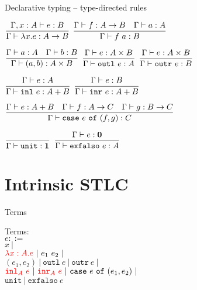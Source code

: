 \documentclass{beamer}
\newcommand{\pipe}{\ |\ }
\newcommand{\Fun}[2]{#1 \to #2}
\newcommand{\Prod}[2]{#1 \times #2}
\newcommand{\Sum}[2]{#1 + #2}
\newcommand{\Unit}{\textbf{1}}
\newcommand{\Empty}{\textbf{0}}
\newcommand{\fun}[2]{\lambda #1. #2}
\newcommand{\app}[2]{#1\ #2}
\newcommand{\pair}[2]{(#1, #2)}
\newcommand{\outl}[1][]{\texttt{outl}\ #1}
\newcommand{\outr}[1][]{\texttt{outr}\ #1}
\newcommand{\inl}[1][]{\texttt{inl}\ #1}
\newcommand{\inr}[1][]{\texttt{inr}\ #1}
\newcommand{\case}[3]{\texttt{case}\ #1\ \texttt{of}\ (#2, #3)}
\newcommand{\unit}{\texttt{unit}}
\newcommand{\exfalso}[1][]{\texttt{exfalso}\ #1}
\newcommand{\fulltyping}[3]{#1 \vdash #2 : #3}
\newcommand{\typing}[2]{\fulltyping{\Gamma}{#1}{#2}}
\newcommand{\infrule}[3][]{\displaystyle \frac{#2}{#3} \textsc{\footnotesize{#1}}}
\newcommand{\extend}[3]{#1, #2 : #3}
\begin{document}
\begin{frame}{Declarative typing -- type-directed rules}

\begin{center}
  $\infrule{\fulltyping{\extend{\Gamma}{x}{A}}{e}{B}}{\typing{\fun{x}{e}}{\Fun{A}{B}}}$ \quad
  $\infrule{\typing{f}{\Fun{A}{B}} \quad \typing{a}{A}}{\typing{\app{f}{a}}{B}}$

  \vspace{2em}

  $\infrule{\typing{a}{A} \quad \typing{b}{B}}{\typing{\pair{a}{b}}{\Prod{A}{B}}}$ \quad
  $\infrule{\typing{e}{\Prod{A}{B}}}{\typing{\outl[e]}{A}}$ \quad
  $\infrule{\typing{e}{\Prod{A}{B}}}{\typing{\outr[e]}{B}}$

  \vspace{2em}

  $\infrule{\typing{e}{A}}{\typing{\inl[e]}{\Sum{A}{B}}}$ \quad
  $\infrule{\typing{e}{B}}{\typing{\inr[e]}{\Sum{A}{B}}}$

  \vspace{2em}

  $\infrule{\typing{e}{\Sum{A}{B}} \quad \typing{f}{\Fun{A}{C}} \quad \typing{g}{\Fun{B}{C}}}{\typing{\case{e}{f}{g}}{C}}$

  \vspace{2em}

  $\infrule{}{\typing{\unit}{\Unit}}$ \quad
  $\infrule{\typing{e}{\Empty}}{\typing{\exfalso[e]}{A}}$
\end{center}

\end{frame}

\section{Intrinsic STLC}

\newcommand{\ifun}[3]{\lambda #1 : #2. #3}
\newcommand{\iinl}[2]{\texttt{inl}_{#1}\ #2}
\newcommand{\iinr}[2]{\texttt{inr}_{#1}\ #2}

\newcommand{\termdiff}[1]{\mathcolor{red}{#1}}

\begin{frame}{Terms}

Terms: \\
$e ::=$ \\
\qquad $x \pipe$ \\
\qquad $\termdiff{\ifun{x}{A}{e}} \pipe \app{e_1}{e_2} \pipe$ \\
\qquad $\pair{e_1}{e_2} \pipe \outl[e] \pipe \outr[e] \pipe$ \\
\qquad $\termdiff{\iinl{A}{e}} \pipe \termdiff{\iinr{A}{e}} \pipe \case{e}{e_1}{e_2} \pipe$ \\
\qquad $\unit \pipe \exfalso{e}$

\vspace{2em}

\end{frame}
\end{document}
